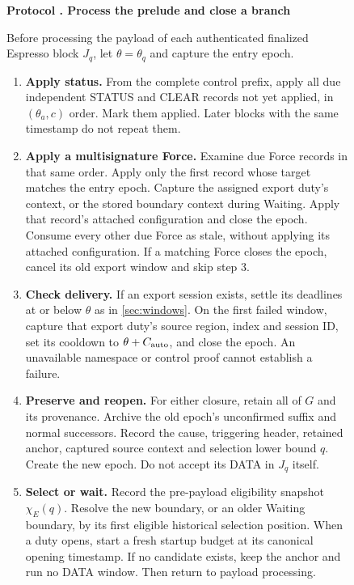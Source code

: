 \documentclass[11pt,a4paper]{article}
\newcounter{protocol}
\newenvironment{protocol}[2]{\begin{figure}[htbp]\refstepcounter{protocol}\label{#1}
\begin{mdframed}[linewidth=.6pt,skipabove=0pt,skipbelow=0pt,
innertopmargin=7pt,innerbottommargin=7pt]\small
\textbf{Protocol \theprotocol. #2}\par\smallskip}{\end{mdframed}\end{figure}}
\begin{document}
\begin{protocol}{alg:force}{Process the prelude and close a branch}
Before processing the payload of each authenticated finalized Espresso
block $J_q$, let $\theta=\theta_q$ and capture the entry epoch.
\begin{enumerate}[label=\textbf{\arabic*)},itemsep=3pt]
\item \textbf{Apply status.} From the complete control prefix, apply
all due independent STATUS and CLEAR records not yet applied, in
$(\theta_a,c)$ order. Mark them applied. Later blocks with the same
timestamp do not repeat them.

\item \textbf{Apply a multisignature Force.} Examine due Force
records in that same order. Apply only the first record whose target
matches the entry epoch. Capture the assigned export duty's context,
or the stored boundary context during Waiting. Apply that record's
attached configuration and close the epoch. Consume every other due
Force as stale, without applying its attached configuration. If a
matching Force closes the epoch, cancel its old export window and
skip step 3.

\item \textbf{Check delivery.} If an export session exists, settle
its deadlines at or below $\theta$ as in \cref{sec:windows}.
On the first failed window, capture that export duty's source region,
index and session ID,
set its cooldown to $\theta+C_{\rm auto}$, and close the epoch.
An unavailable namespace or control proof cannot establish a failure.

\item \textbf{Preserve and reopen.} For either closure, retain all
of $G$ and its provenance. Archive the old epoch's unconfirmed suffix
and normal successors. Record the cause, triggering header, retained
anchor, captured source context and selection lower bound $q$.
Create the new epoch. Do not accept its DATA in $J_q$ itself.

\item \textbf{Select or wait.} Record the pre-payload eligibility
snapshot $\chi_E(q)$. Resolve the new boundary, or an older Waiting
boundary, by its first eligible historical selection position.
When a duty opens, start a fresh startup budget at its canonical
opening timestamp. If no candidate exists, keep the anchor and run
no DATA window. Then return to payload processing.
\end{enumerate}
\end{protocol}
\end{document}
